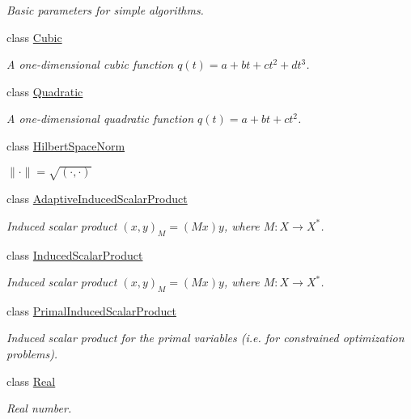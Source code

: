 \begin{DoxyCompactItemize}
\begin{DoxyCompactList}\small\item\em \-Basic parameters for simple algorithms. \end{DoxyCompactList}\item 
class \hyperlink{classSpacy_1_1Cubic}{\-Cubic}
\begin{DoxyCompactList}\small\item\em \-A one-\/dimensional cubic function $q(t) = a + bt + ct^2 + dt^3$. \end{DoxyCompactList}\item 
class \hyperlink{classSpacy_1_1Quadratic}{\-Quadratic}
\begin{DoxyCompactList}\small\item\em \-A one-\/dimensional quadratic function $q(t) = a + bt + ct^2$. \end{DoxyCompactList}\item 
class \hyperlink{classSpacy_1_1HilbertSpaceNorm}{\-Hilbert\-Space\-Norm}
\begin{DoxyCompactList}\small\item\em $ \|\cdot\|=\sqrt{(\cdot,\cdot)} $ \end{DoxyCompactList}\item 
class \hyperlink{classSpacy_1_1AdaptiveInducedScalarProduct}{\-Adaptive\-Induced\-Scalar\-Product}
\begin{DoxyCompactList}\small\item\em \-Induced scalar product $(x,y)_M = (Mx)y$, where $M:X\rightarrow X^*$. \end{DoxyCompactList}\item 
class \hyperlink{classSpacy_1_1InducedScalarProduct}{\-Induced\-Scalar\-Product}
\begin{DoxyCompactList}\small\item\em \-Induced scalar product $(x,y)_M = (Mx)y$, where $M:X\rightarrow X^*$. \end{DoxyCompactList}\item 
class \hyperlink{classSpacy_1_1PrimalInducedScalarProduct}{\-Primal\-Induced\-Scalar\-Product}
\begin{DoxyCompactList}\small\item\em \-Induced scalar product for the primal variables (i.\-e. for constrained optimization problems). \end{DoxyCompactList}\item 
class \hyperlink{classSpacy_1_1Real}{\-Real}
\begin{DoxyCompactList}\small\item\em \-Real number. \end{DoxyCompactList}\item 

\end{DoxyCompactItemize}
